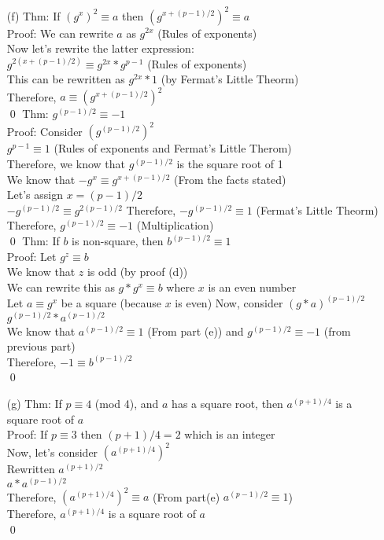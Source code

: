 \documentclass[11pt]{article}
\theoremstyle{definition}
\begin{document}
\begin{enumerate}
	\item[(f)]
	Thm: If $(g^x)^2 \equiv a$ then $(g^{x + (p-1)/2})^2 \equiv a$\\
	\newline
	Proof: We can rewrite $a$ as $g^{2x}$ (Rules of exponents)\\
	Now let's rewrite the latter expression:\\
	$g^{2(x + (p-1)/2)} \equiv g^{2x} * g^{p-1}$ (Rules of exponents)\\
	This can be rewritten as $g^{2x} * 1$ (by Fermat's Little Theorm)\\
	Therefore, $a \equiv (g^{x + (p-1)/2})^2$\\
	\qed
	\newline
	Thm: $g^{(p-1)/2} \equiv -1$\\
	\newline
	Proof: Consider $(g^{(p-1)/2})^2$\\
	$g^{p-1} \equiv 1$  (Rules of exponents and Fermat's Little Therom)\\
	Therefore, we know that $g^{(p-1)/2}$ is the square root of 1\\
	We know that $-g^x \equiv g^{x + (p-1)/2}$ (From the facts stated)\\
	Let's assign $x = (p-1)/2$\\
	$-g^{(p-1)/2} \equiv g^{2(p-1)/2}$
	Therefore, $-g^{(p-1)/2} \equiv 1$ (Fermat's Little Theorm)\\
	Therefore, $g^{(p-1)/2} \equiv -1$ (Multiplication)\\
	\qed
	\newline
	Thm: If $b$ is non-square, then $b^{(p-1)/2} \equiv 1$\\
	\newline
	Proof: Let $g^z \equiv b$\\
	We know that $z$ is odd (by proof (d))\\
	We can rewrite this as $g * g^x \equiv b$ where $x$ is an even number\\
	Let $a \equiv g^x$ be a square (because $x$ is even)
	Now, consider $(g*a)^{(p-1)/2}$\\
	$g^{(p-1)/2} * a^{(p-1)/2}$\\
	We know that $a^{(p-1)/2} \equiv 1$ (From part (e)) and $g^{(p-1)/2} \equiv -1$ (from previous part)\\
	Therefore, $-1 \equiv b^{(p-1)/2}$\\
	\qed

	\item[(g)]
	Thm: If $p \equiv 4$ (mod 4), and $a$ has a square root, then $a^{(p+1)/4}$ is a square root of $a$\\
	\newline
	Proof: If $p \equiv 3$ then $(p+1)/4 = 2$ which is an integer\\
	Now, let's consider $(a^{(p+1)/4})^2$\\
	Rewritten $a^{(p+1)/2}$\\
	$a * a^{(p-1)/2}$\\
	Therefore, $(a^{(p+1)/4})^2 \equiv a$ (From part(e) $a^{(p-1)/2} \equiv 1$)\\
	Therefore, $a^{(p+1)/4}$ is a square root of $a$\\
	\qed


\end{enumerate}
\end{document}
